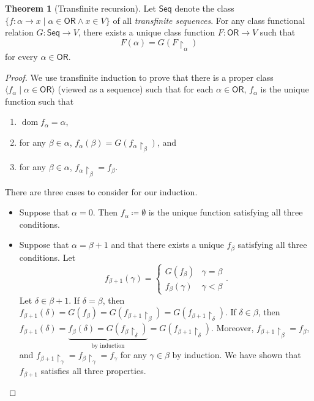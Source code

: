 \documentclass[10pt,letterpaper,cm]{nupset}
\theoremstyle{definition}
\theoremstyle{theorem}
\newtheorem{theorem}[definition]{Theorem}
\theoremstyle{remark}
\newcommand{\1}{\mathbf{1}}
\newcommand{\0}{\vec 0}
\newcommand{\ord}{\mathsf{OR}}
\DeclareMathOperator{\dom}{dom}
\begin{document}
\begin{theorem}[Transfinite recursion]
Let $\mathsf{Seq}$ denote the class $\{ f : \alpha \to x \mid \alpha \in \ord \land x\in V\}$ of all \textit{transfinite sequences}. For any class functional relation $G:\mathsf{Seq} \to V$, there exists a unique class function $F: \ord \to V$ such that $$ F(\alpha) =G(F\restriction_{\alpha})    $$ for every $\alpha \in \ord$.
\end{theorem}
\begin{proof}
We use transfinite induction to prove that there is a proper class $\langle f_{\alpha} \mid \alpha \in \ord \rangle$ (viewed as a sequence) such that for each $\alpha \in \ord$,  $f_{\alpha}$ is the unique function such that 
\begin{enumerate}[label=(\roman*)]
\item $\dom{f_{\alpha}} = \alpha$,
\item for any $\beta \in \alpha$, $f_{\alpha}(\beta)= G(f_{\alpha}\restriction_{\beta})$, and
\item for any $\beta \in \alpha$, $f_{\alpha}\restriction_{\beta} = f_{\beta}$.
\end{enumerate}
There are three cases to consider for our induction.
\begin{itemize}
\item Suppose that $\alpha = 0$. Then $f_{\alpha} \coloneqq \emptyset$ is the unique function satisfying all three conditions. 
\item Suppose that $\alpha = \beta +1$ and that there exists a unique $f_{\beta}$ satisfying all three conditions. Let
\[ 
f_{\beta+1}(\gamma) =
\begin{cases}
G(f_{\beta}) & \gamma = 	\beta
\\ f_{\beta}(\gamma) & \gamma < \beta
\end{cases}.
\] Let $\delta \in \beta +1$.  If $\delta = \beta$, then $f_{\beta+1}(\delta) = G(f_{\beta}) = G(f_{\beta+1}\restriction_{\beta}) = G(f_{\beta+1}\restriction_{\delta}) .$ If $\delta \in \beta$, then $f_{\beta+1}(\delta) = \underbrace{f_{\beta}(\delta) = G(f_{\beta}\restriction_{\delta})}_{\text{by induction}} = G(f_{\beta+1}\restriction_{\delta})$. 
Moreover, $f_{\beta +1}\restriction_{\beta} = f_{\beta}$, and $f_{\beta +1}\restriction_{\gamma} = f_{\beta}\restriction_{\gamma} = f_{\gamma}$ for any $\gamma \in \beta$ by induction. We have shown that $f_{\beta +1}$ satisfies all three properties. 


\end{itemize}
\end{proof}
\end{document}
